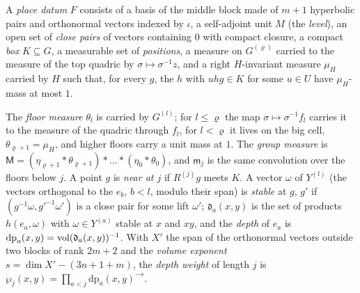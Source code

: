 \begin{definition}\label{def:place-datum}
A \emph{place datum} $F$ consists of a basis of the middle block made of $m+1$ hyperbolic pairs and orthonormal vectors indexed by $\iota$, a self-adjoint unit $M$ (the \emph{level}), an open set of
\emph{close pairs} of vectors containing $0$ with compact closure, a compact \emph{box} $K\subseteq G$, a measurable set of \emph{positions}, a measure on $G^{(\varrho)}$ carried to the measure of the top
quadric by $\sigma\mapsto\sigma^{-1}z$, and a right $H$-invariant measure $\mu_H$ carried by $H$ such that, for every $g$, the $h$ with $uhg\in K$ for some $u\in U$ have $\mu_H$-mass at most $1$.
\end{definition}
The \emph{floor measure} $\theta_l$ is carried by $G^{(l)}$; for $l\le\varrho$ the map $\sigma\mapsto\sigma^{-1}f_l$ carries it to the measure of the quadric through $f_l$, for $l<\varrho$ it lives on the big cell,
$\theta_{\varrho+1}=\mu_H$, and higher floors carry a unit mass at $1$. The \emph{group measure} is $\mathsf M=(\eta_{\varrho+1}*\theta_{\varrho+1})*\dots*(\eta_0*\theta_0)$, and $\mathsf m_j$ is the same convolution over the floors
below $j$. A point $g$ is \emph{near at $j$} if $R^{(j)}g$ meets $K$. A vector $\omega$ of $Y^{(l)}$ (the vectors orthogonal to the $e_b$, $b<l$, modulo their span) is \emph{stable} at $g$, $g'$ if
$(g^{-1}\omega,g'^{-1}\omega')$ is a close pair for some lift $\omega'$; $\mathfrak d_a(x,y)$ is the set of products $h(e_a,\omega)$ with $\omega\in Y^{(a)}$ stable at $x$ and $xy$, and the \emph{depth} of
$e_a$ is $\mathrm{dp}_a(x,y)=\operatorname{vol}(\mathfrak d_a(x,y))^{-1}$. With $X'$ the span of the orthonormal vectors outside two blocks of rank $2m+2$ and the \emph{volume exponent} $s=\dim X'-(3n+1+m)$, the
\emph{depth weight} of length $j$ is $\wp_j(x,y)=\prod_{a<j}\mathrm{dp}_a(x,y)^{-s}$.
